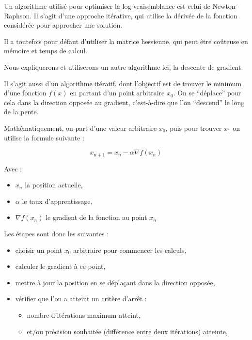 \documentclass[10pt,french]{report}
\begin{document}
    Un algorithme utilisé pour optimiser la log-vraisemblance est celui de Newton-Raphson. Il s'agit d'une approche itérative, qui utilise la dérivée de la fonction considérée pour approcher une solution.

    Il a toutefois pour défaut d'utiliser la matrice hessienne, qui peut être coûteuse en mémoire et temps de calcul.

    Nous expliquerons et utiliserons un autre algorithme ici, la descente de gradient.

    Il s'agit aussi d'un algorithme itératif, dont l'objectif est de trouver le minimum d'une fonction $f\left(x\right)$ en partant d'un point arbitraire $x_0$. On se \enquote{déplace} pour cela dans la direction opposée au gradient, c'est-à-dire que l'on \enquote{descend} le long de la pente.

    Mathématiquement, on part d'une valeur arbitraire $x_0$, puis pour trouver $x_1$ on utilise la formule suivante :

    \begin{equation}
        x_{n+1} = x_n - \alpha \nabla f\left(x_n\right)
    \end{equation}

    Avec :
    \begin{itemize}
        \item $x_n$ la position actuelle,
        \item $\alpha$ le taux d'apprentissage,
        \item $\nabla f\left(x_n\right)$ le gradient de la fonction au point $x_n$
    \end{itemize}

    Les étapes sont donc les suivantes :
    \begin{itemize}
        \item choisir un point $x_0$ arbitraire pour commencer les calculs,
        \item calculer le gradient à ce point,
        \item mettre à jour la position en se déplaçant dans la direction opposée,
        \item vérifier que l'on a atteint un critère d'arrêt :
        \begin{itemize}
            \item nombre d'itérations maximum atteint,
            \item et/ou précision souhaitée (différence entre deux itérations) atteinte,
        \end{itemize}
    \end{itemize}
\end{document}
